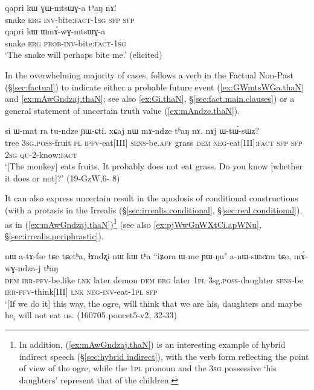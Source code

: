 \begin{exe}
\ex 
\begin{xlist}
 \ex \label{ex:GWmtsWGa.thaN}
\gll qapri kɯ ɣɯ-mtsɯɣ-a tʰaŋ nɤ! \\
 snake \textsc{erg} \textsc{inv}-bite:\textsc{fact}-\textsc{1sg} \textsc{sfp} \textsc{sfp} \\
 \ex \label{ex:WmAwGmtsWGa}
\gll  qapri kɯ ɯmɤ́-wɣ-mtsɯɣ-a \\
 snake \textsc{erg} \textsc{prob}-\textsc{inv}-bite:\textsc{fact}-\textsc{1sg} \\
 \glt `The snake will perhaps bite me.' (elicited)
 \end{xlist}
 \end{exe} 

In the overwhelming majority of cases,  follows a verb in the Factual Non-Past (§\ref{sec:factual}) to indicate either a probable future event (\ref{ex:GWmtsWGa.thaN} and \ref{ex:mAwGndzaj.thaN}; see also \ref{ex:Gi.thaN}, §\ref{sec:fact.main.clauses}) or a general statement of uncertain truth value (\ref{ex:mAndze.thaN}).

\begin{exe}
\ex \label{ex:mAndze.thaN}
\gll si ɯ-mat ra tu-ndze ɲɯ-ɕti.  xɕaj nɯ mɤ-ndze tʰaŋ nɤ. nɤj ɯ-tɯ́-sɯz? \\
 tree \textsc{3sg}.\textsc{poss}-fruit \textsc{pl} \textsc{ipfv}-eat[III] \textsc{sens}-be.\textsc{aff} grass \textsc{dem} \textsc{neg}-eat[III]:\textsc{fact} \textsc{sfp} \textsc{sfp}  \textsc{2sg} \textsc{qu}-2-know:\textsc{fact} \\
 \glt `[The monkey] eats fruits. It probably does not eat grass. Do you know [whether it does or not]?' (19-GzW,6- 8)
\end{exe} 
 
It can also express uncertain result in the apodosis of conditional constructions (with a protasis in the Irrealis (§\ref{sec:irrealis.conditional}, §\ref{sec:real.conditional}), as in (\ref{ex:mAwGndzaj.thaN})\footnote{In addition, (\ref{ex:mAwGndzaj.thaN}) is an interesting example of hybrid indirect speech (§\ref{sec:hybrid indirect}), with the verb form  reflecting the point of view of the ogre, while the \textsc{1pl} pronoun  and the \textsc{3sg} possessive   `his daughters' represent that of the children. } (see also \ref{ex:pjWwGnWXtCi.apWNu}, §\ref{sec:irrealis.periphrastic}).

\begin{exe}
\ex \label{ex:mAwGndzaj.thaN}
\gll  nɯ a-tɤ-fse tɕe tɕetʰa,  ɬɤndʐi nɯ kɯ tʰa ``iʑora ɯ-me ɲɯ-ŋu" a-nɯ-sɯsɤm tɕe, mɤ́-wɣ-ndza-j tʰaŋ \\
\textsc{dem} \textsc{irr}-\textsc{pfv}-be.like \textsc{lnk} later demon \textsc{dem} \textsc{erg} later \textsc{1pl} 3sg.\textsc{poss}-daughter \textsc{sens}-be \textsc{irr}-\textsc{pfv}-think[III] \textsc{lnk} \textsc{neg}-\textsc{inv}-eat-\textsc{1pl} \textsc{sfp} \\
\glt `[If we do it] this way, the ogre$_i$ will think that we are his$_i$ daughters and maybe he$_i$ will not eat us. (160705 poucet5-v2, 32-33)
\end{exe} 

